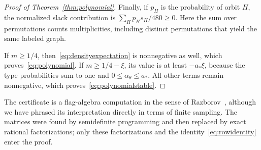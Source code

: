 \begin{proof}[Proof of Theorem~\ref{thm:polynomial}]
Finally, if $p_H$ is the probability of orbit $H$, the normalized slack contribution is $\sum_Hp_Hs_H/480\ge0$. Here the sum over permutations counts multiplicities, including distinct permutations that yield the same labeled graph.

If $m\ge1/4$, then~\eqref{eq:densityexpectation} is nonnegative as well, which proves~\eqref{eq:polynomial}. If $m\ge1/4-\xi$, its value is at least $-a_*\xi$, because the type probabilities sum to one and $0\le\alpha_\theta\le a_*$. All other terms remain nonnegative, which proves~\eqref{eq:polynomialstable}.
\end{proof}

The certificate is a flag-algebra computation in the sense of Razborov~\cite{Razborov2007}, although we have phrased its interpretation directly in terms of finite sampling. The matrices were found by semidefinite programming and then replaced by exact rational factorizations; only these factorizations and the identity~\eqref{eq:rowidentity} enter the proof.
